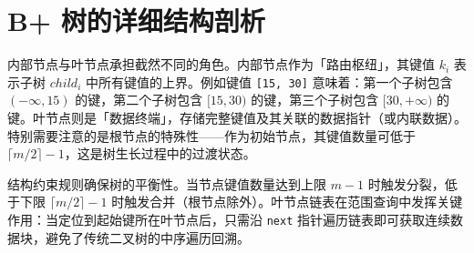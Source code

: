 \chapter{B+ 树的详细结构剖析}
内部节点与叶节点承担截然不同的角色。内部节点作为「路由枢纽」，其键值 $k_i$ 表示子树 $child_i$ 中所有键值的上界。例如键值 \texttt{[15, 30]} 意味着：第一个子树包含 $(-\infty, 15)$ 的键，第二个子树包含 $[15, 30)$ 的键，第三个子树包含 $[30, +\infty)$ 的键。叶节点则是「数据终端」，存储完整键值及其关联的数据指针（或内联数据）。特别需要注意的是根节点的特殊性——作为初始节点，其键值数量可低于 $\lceil m/2 \rceil -1$，这是树生长过程中的过渡状态。\par
结构约束规则确保树的平衡性。当节点键值数量达到上限 $m-1$ 时触发分裂，低于下限 $\lceil m/2 \rceil -1$ 时触发合并（根节点除外）。叶节点链表在范围查询中发挥关键作用：当定位到起始键所在叶节点后，只需沿 \texttt{next} 指针遍历链表即可获取连续数据块，避免了传统二叉树的中序遍历回溯。\par
